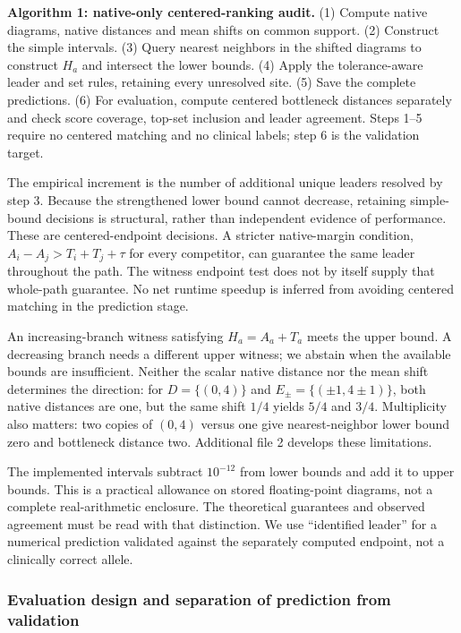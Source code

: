 \documentclass[
  11pt,
]{article}
\begin{document}
\textbf{Algorithm 1: native-only centered-ranking audit.} (1) Compute
native diagrams, native distances and mean shifts on common support. (2)
Construct the simple intervals. (3) Query nearest neighbors in the
shifted diagrams to construct \(H_a\) and intersect the lower bounds.
(4) Apply the tolerance-aware leader and set rules, retaining every
unresolved site. (5) Save the complete predictions. (6) For evaluation,
compute centered bottleneck distances separately and check score
coverage, top-set inclusion and leader agreement. Steps 1--5 require no
centered matching and no clinical labels; step 6 is the validation
target.

The empirical increment is the number of additional unique leaders
resolved by step 3. Because the strengthened lower bound cannot
decrease, retaining simple-bound decisions is structural, rather than
independent evidence of performance. These are centered-endpoint
decisions. A stricter native-margin condition, \(A_i-A_j>T_i+T_j+\tau\)
for every competitor, can guarantee the same leader throughout the path.
The witness endpoint test does not by itself supply that whole-path
guarantee. No net runtime speedup is inferred from avoiding centered
matching in the prediction stage.

An increasing-branch witness satisfying \(H_a=A_a+T_a\) meets the upper
bound. A decreasing branch needs a different upper witness; we abstain
when the available bounds are insufficient. Neither the scalar native
distance nor the mean shift determines the direction: for
\(D=\{(0,4)\}\) and \(E_\pm=\{(\pm1,4\pm1)\}\), both native distances
are one, but the same shift \(1/4\) yields \(5/4\) and \(3/4\).
Multiplicity also matters: two copies of \((0,4)\) versus one give
nearest-neighbor lower bound zero and bottleneck distance two.
Additional file 2 develops these limitations.

The implemented intervals subtract \(10^{-12}\) from lower bounds and
add it to upper bounds. This is a practical allowance on stored
floating-point diagrams, not a complete real-arithmetic enclosure. The
theoretical guarantees and observed agreement must be read with that
distinction. We use ``identified leader'' for a numerical prediction
validated against the separately computed endpoint, not a clinically
correct allele.

\subsubsection{Evaluation design and separation of prediction from
validation}\label{evaluation-design-and-separation-of-prediction-from-validation}
\end{document}
